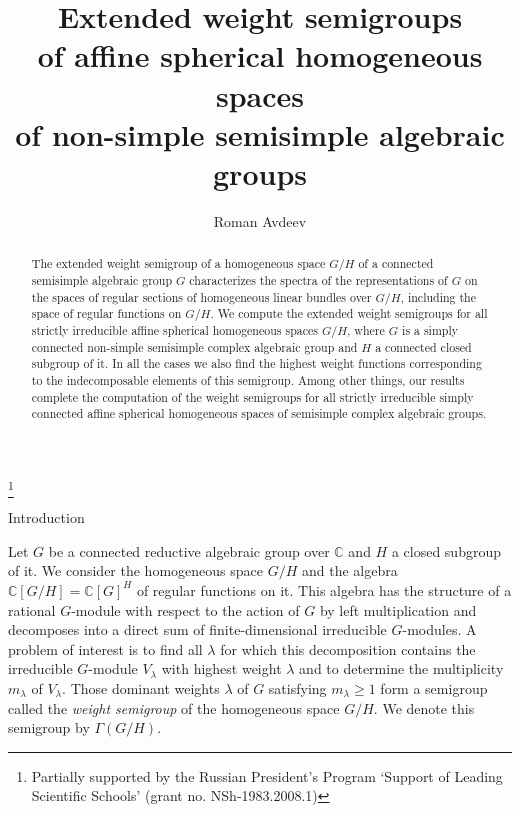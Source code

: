 \documentclass[12pt]{amsart}
\theoremstyle{definition}
\theoremstyle{remark}
\begin{document}
\title[Extended weight semigroups]{Extended weight semigroups\\ of affine spherical homogeneous spaces\\ of non-simple semisimple algebraic groups}

\author{Roman Avdeev}

\thanks{Partially supported by the Russian President's Program `Support of Leading Scientific Schools' (grant no. NSh-1983.2008.1)}

\address{Chair of Higher Algebra, Department of Mechanics and Mathematics,
Moscow State University, 1, Leninskie Gory, Moscow, 119992, Russia}




\begin{abstract}
The extended weight semigroup of a homogeneous space $G/H$ of a
connected semisimple algebraic group $G$ characterizes the spectra
of the representations of $G$ on the spaces of regular sections of
homogeneous linear bundles over $G/H$, including the space of
regular functions on $G/H$. We compute the extended weight
semigroups for all strictly irreducible affine spherical homogeneous
spaces $G/H$, where $G$ is a simply connected non-simple semisimple
complex algebraic group and $H$ a connected closed subgroup of it.
In all the cases we also find the highest weight functions
corresponding to the indecomposable elements of this semigroup.
Among other things, our results complete the computation of the
weight semigroups for all strictly irreducible simply connected
affine spherical homogeneous spaces of semisimple complex algebraic
groups.
\end{abstract}

\maketitle

{}{Introduction}
\label{sec1}

{}{}
\label{ssec1.1} Let $G$ be a connected reductive algebraic group
over $\mathbb C$ and $H$ a closed subgroup of it. We consider the
homoge\-ne\-ous space $G/H$ and the algebra $\mathbb C[G/H] =\mathbb
C[G]^H$ of regular functions on it. This algebra has the structure
of a rational $G$-module with respect to the action of $G$ by left
multiplication and decomposes into a direct sum of
finite-dimensional irreducible $G$-modules. A problem of interest is
to find all $\lambda$ for which this decomposition contains the
irreducible $G$-module $V_\lambda$ with highest weight $\lambda$ and
to determine the multiplicity $m_\lambda$ of $V_\lambda$. Those
dominant weights $\lambda$ of $G$ satisfying $m_\lambda{\geqslant}1$ form a
semigroup called the \textit{weight semigroup} of the homogeneous
space $G/H$. We denote this semigroup by $\Gamma(G/H)$.
\end{document}
